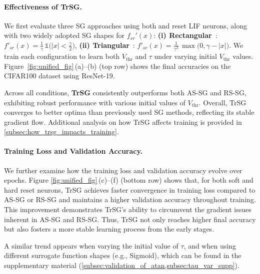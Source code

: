 \paragraph{Effectiveness of TrSG.}
We first evaluate three SG approaches using both  and  reset LIF neurons, along with two widely adopted SG shapes for $f_{sr}'(x)$: \textbf{(i) Rectangular}~\cite{zheng:2021,rathi:2023,wang:2022}: 
    \(
    f'_{sr}(x)=\tfrac{1}{\gamma}\,\mathds{1}\bigl(|x|<\tfrac{\gamma}{2}\bigr)
    \), \textbf{(ii) Triangular}~\cite{meng:2023,deng:2022,tab:2024}: 
    \(
    f'_{sr}(x)=\tfrac{1}{\gamma^2}\,\max\!\bigl(0,\gamma - |x|\bigr).
    \)
We train each configuration to learn both $V_{\text{thr}}$ and $\tau$ under varying initial $V_{\text{thr}}$ values. 
Figure~\ref{fig:unified_fig}\,(a)--(b) (top row) shows the final accuracies on the CIFAR100 dataset using ResNet-19.

Across all conditions, \textbf{TrSG} consistently outperforms both AS-SG and RS-SG, exhibiting robust performance with various initial values of $V_{\text{thr}}$. Overall, TrSG converges to better optima than previously used SG methods, reflecting its stable gradient flow. Additional analysis on how TrSG affects training is provided in \cref{subsec:how_trsg_impacts_training}.

\paragraph{Training Loss and Validation Accuracy.}
We further examine how the training loss and validation accuracy evolve over epochs. Figure \ref{fig:unified_fig}\,(c)--(f) (bottom row) shows that, for both soft and hard reset neurons, TrSG achieves faster convergence in training loss compared to AS-SG or RS-SG and maintains a higher validation accuracy throughout training. This improvement demonstrates TrSG’s ability to circumvent the gradient issues inherent in AS-SG and RS-SG. Thus, TrSG not only reaches higher final accuracy but also fosters a more stable learning process from the early stages.

A similar trend appears when varying the initial value of $\tau$, and when using different surrogate function shapes (e.g., Sigmoid), which can be found in the supplementary material (\cref{subsec:validation_of_atan,subsec:tau_var_supp}).

